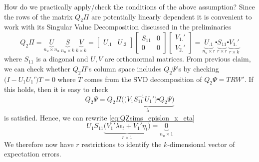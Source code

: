 \documentclass[a4paper,10pt]{article}  %
\begin{document}
How do we practically apply/check the conditions of the above assumption? Since the rows of the matrix $ Q_2\Pi $ are potentially linearly
dependent it is convenient to work with its Singular Value Decomposition discussed in the preliminaries
\[
   Q_2 \Pi = \underbrace{U}_{n_u \times n_u} \ \underbrace{S}_{ n_u\times k } \ \underbrace{V}_{k \times k} = 
   \begin{bmatrix}
      U_{.1} & U_{.2}
   \end{bmatrix}
   \begin{bmatrix}
      S_{11} & 0 \\ 0 & 0
   \end{bmatrix}
   \begin{bmatrix}
      V_{1.}' \\ V_{2.}'
   \end{bmatrix}
   =  \underbrace{U_{.1} }_{n_u \times r } \centerdot     
      \underbrace{S_{11} }_{ r  \times r } \centerdot    
      \underbrace{V_{1.}'}_{ r  \times k }   
\]
where $ S_{11} $ is a diagonal and $ U,V $ are orthonormal matrices. From previous claim, we can check whether $ Q_2 \Pi $'s column
space includes $ Q_2 \Psi $'s by checking $ \big(I-U_1U_{1}'\big)T = 0 $  where $ T $ comes from the SVD decomposition of $ Q_2\Psi = T
R W' $. If this holds, then it is easy to check
\[
   Q_2\Psi = Q_2 \Pi \underbrace{\Big( \big(V_1 S_{11}^{-1} U_1' \big) \centerdot Q_2 \Psi \Big)}_{ \lambda }
\]
is satisfied. Hence, we can rewrite \eqref{eq:QZsims_epislon_x_eta}
\begin{equation}
   U_1S_{11} \underbrace{\big( V_{1}'\lambda \epsilon_t +  V_{1}' \eta_t \big)}_{r\times 1} = \underbrace{0}_{n_u \times 1}
\end{equation}
We therefore now have $r$ restrictions to identify the $k$-dimensional vector of expectation errors.




\clearpage
\newpage
% 
% 


\end{document}
